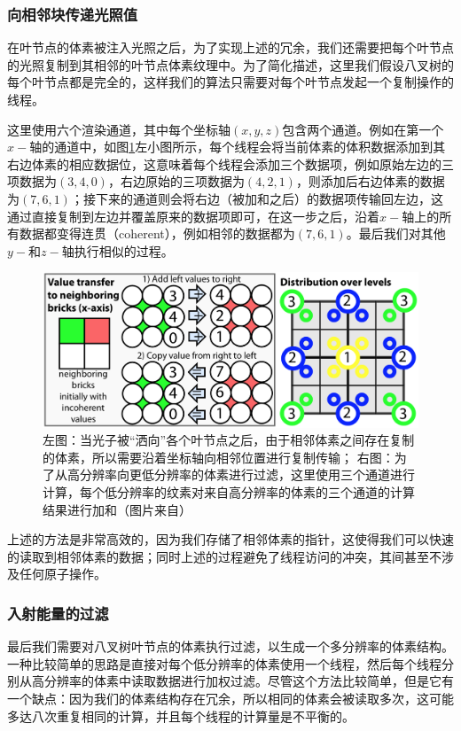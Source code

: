 \subsubsection{向相邻块传递光照值}
在叶节点的体素被注入光照之后，为了实现上述的冗余，我们还需要把每个叶节点的光照复制到其相邻的叶节点体素纹理中。为了简化描述，这里我们假设八叉树的每个叶节点都是完全的，这样我们的算法只需要对每个叶节点发起一个复制操作的线程。

这里使用六个渲染通道，其中每个坐标轴$(x,y,z)$包含两个通道。例如在第一个$x-$轴的通道中，如图\ref{f:vct-light-transfer}左小图所示，每个线程会将当前体素的体积数据添加到其右边体素的相应数据位，这意味着每个线程会添加三个数据项，例如原始左边的三项数据为$(3,4,0)$，右边原始的三项数据为$(4,2,1)$，则添加后右边体素的数据为$(7,6,1)$；接下来的通道则会将右边（被加和之后）的数据项传输回左边，这通过直接复制到左边并覆盖原来的数据项即可，在这一步之后，沿着$x-$轴上的所有数据都变得连贯（coherent），例如相邻的数据都为$(7,6,1)$。最后我们对其他$y-$和$z-$轴执行相似的过程。

\begin{figure}
	\includegraphics[width=\textwidth]{figures/vct/light-transfer}
	\caption{左图：当光子被“洒向”各个叶节点之后，由于相邻体素之间存在复制的体素，所以需要沿着坐标轴向相邻位置进行复制传输； 右图：为了从高分辨率向更低分辨率的体素进行过滤，这里使用三个通道进行计算，每个低分辨率的纹素对来自高分辨率的体素的三个通道的计算结果进行加和（图片来自\cite{a:InteractiveIndirectIlluminationUsingVoxelConeTracing}）}
	\label{f:vct-light-transfer}
\end{figure}

上述的方法是非常高效的，因为我们存储了相邻体素的指针，这使得我们可以快速的读取到相邻体素的数据；同时上述的过程避免了线程访问的冲突，其间甚至不涉及任何原子操作。



\subsubsection{入射能量的过滤}
最后我们需要对八叉树叶节点的体素执行过滤，以生成一个多分辨率的体素结构。一种比较简单的思路是直接对每个低分辨率的体素使用一个线程，然后每个线程分别从高分辨率的体素中读取数据进行加权过滤。尽管这个方法比较简单，但是它有一个缺点：因为我们的体素结构存在冗余，所以相同的体素会被读取多次，这可能多达八次重复相同的计算，并且每个线程的计算量是不平衡的。

